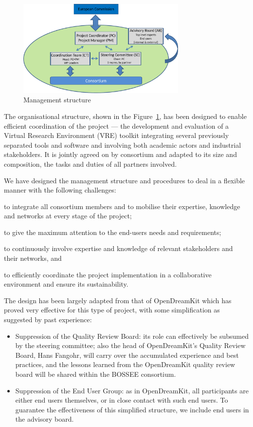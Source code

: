 \begin{figure}
  \centering
  \includegraphics[width=0.75\textwidth]{management_structure.pdf}
  \caption{Management structure}
  \label{figure.management}
\end{figure}

The organisational structure, shown in the Figure~\ref{figure.management}, has been designed
to enable efficient coordination of the project --- the
development and evaluation of a Virtual Research Environment (VRE) toolkit
integrating several previously separated tools and software and
involving both academic actors and industrial stakeholders. It is jointly agreed on
by \TheProject consortium and adapted to its size and composition,
the tasks and duties of all partners involved.

We have designed the management structure and procedures to deal in a
flexible manner with the following challenges:
\begin{compactitem}
\item to integrate all consortium members and to mobilise their
  expertise, knowledge and networks at every stage of the project;
\item to give the maximum attention to the end-users needs and
  requirements;
\item to continuously involve expertise and knowledge of relevant
  stakeholders and their networks, and
\item to efficiently coordinate the project implementation in a
  collaborative environment and ensure its sustainability.
\end{compactitem}

The design has been largely adapted from that of OpenDreamKit which
has proved very effective for this type of project, with some
simplification as suggested by past experience:
\begin{itemize}
\item Suppression of the Quality Review Board: its role can
  effectively be subsumed by the steering committee; also the head of
  OpenDreamKit's Quality Review Board, Hans Fangohr, will carry over
  the accumulated experience and best practices, and the lessons
  learned from the OpenDreamKit quality review board will be shared
  within the BOSSEE consortium.
\item Suppression of the End User Group: as in OpenDreamKit, all
  participants are either end users themselves, or in close contact
  with such end users. To guarantee the effectiveness of this
  simplified structure, we include end users in the advisory board.
\end{itemize}


